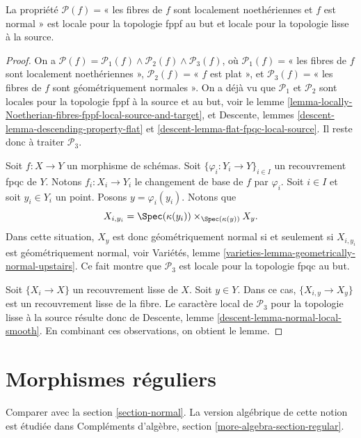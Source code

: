 \begin{lemma}
\label{lemma-normal-fppf-local-source-and-target}
La propriété
$\mathcal{P}(f)=$« les fibres de $f$ sont localement noethériennes et $f$ est normal »
est locale pour la topologie fppf au but et
locale pour la topologie lisse à la source.
\end{lemma}

\begin{proof}
On a
$\mathcal{P}(f) =
\mathcal{P}_1(f) \wedge \mathcal{P}_2(f) \wedge \mathcal{P}_3(f)$,
où
$\mathcal{P}_1(f)=$« les fibres de $f$ sont localement noethériennes »,
$\mathcal{P}_2(f)=$« $f$ est plat », et
$\mathcal{P}_3(f)=$« les fibres de $f$ sont géométriquement normales ».
On a déjà vu que $\mathcal{P}_1$ et $\mathcal{P}_2$
sont locales pour la topologie fppf à la source et au but, voir le
lemme \ref{lemma-locally-Noetherian-fibres-fppf-local-source-and-target},
et Descente, lemmes \ref{descent-lemma-descending-property-flat} et
\ref{descent-lemma-flat-fpqc-local-source}. Il reste donc à traiter
$\mathcal{P}_3$.

\medskip\noindent
Soit $f : X \to Y$ un morphisme de schémas.
Soit $\{\varphi_i : Y_i \to Y\}_{i \in I}$ un recouvrement fpqc de $Y$.
Notons $f_i : X_i \to Y_i$ le changement de base de $f$ par $\varphi_i$.
Soit $i \in I$ et soit $y_i \in Y_i$ un point.
Posons $y = \varphi_i(y_i)$. Notons que
$$
X_{i, y_i} = \Spec(\kappa(y_i)) \times_{\Spec(\kappa(y))} X_y.
$$
Dans cette situation, $X_y$ est donc géométriquement normal si et
seulement si $X_{i, y_i}$ est géométriquement normal, voir
Variétés, lemme \ref{varieties-lemma-geometrically-normal-upstairs}.
Ce fait montre que $\mathcal{P}_3$ est locale pour la topologie fpqc au but.

\medskip\noindent
Soit $\{X_i \to X\}$ un recouvrement lisse de $X$.
Soit $y \in Y$. Dans ce cas, $\{X_{i, y} \to X_y\}$ est un
recouvrement lisse de la fibre. Le caractère local de $\mathcal{P}_3$
pour la topologie lisse à la source résulte donc de
Descente, lemme \ref{descent-lemma-normal-local-smooth}.
En combinant ces observations, on obtient le lemme.
\end{proof}
\section{Morphismes réguliers}
\label{section-regular}

\noindent
Comparer avec la section \ref{section-normal}. La version algébrique de
cette notion est étudiée dans
Compléments d'algèbre, section \ref{more-algebra-section-regular}.

